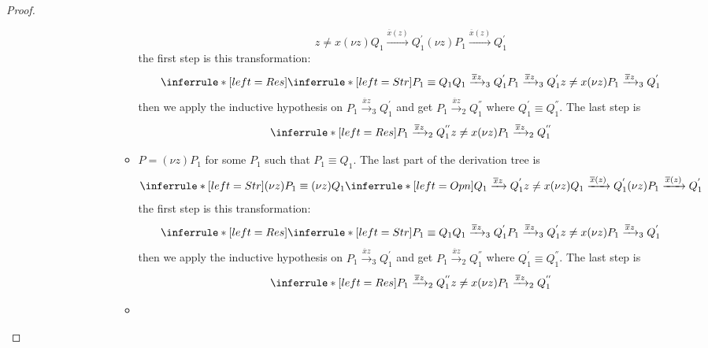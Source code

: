 \begin{theorem}
\begin{proof}
\begin{description}
\begin{description}
\begin{itemize}
\begin{description}
\begin{itemize}
\[{{				  z\neq x
			      }{
				(\nu z) Q_{1} \xrightarrow{\overline{x}(z)} Q_{1}^{'}
			      }
			  }{
			    (\nu z) P_{1} \xrightarrow{\overline{x}(z)} Q_{1}^{'}
			  }
			\]
			the first step is this transformation:
			\[
			  \inferrule* [left=Res]{
			      \inferrule* [left=Str]{
				  P_{1}\equiv Q_{1}
				\\
				  Q_{1}\xrightarrow{\overline{x}z}_{3}Q_{1}^{'}
			      }{
				P_{1}\xrightarrow{\overline{x}z}_{3}Q_{1}^{'}
			      }
			    \\
			      z\neq x
			  }{
			    (\nu z)P_{1}\xrightarrow{\overline{x}z}_{3}Q_{1}^{'}
			  }
			\]
			then we apply the inductive hypothesis on $P_{1}\xrightarrow{\overline{x}z}_{3}Q_{1}^{'}$ and get $P_{1}\xrightarrow{\overline{x}z}_{2}Q_{1}^{''}$ where $Q_{1}^{'}\equiv Q_{1}^{''}$. The last step is 
			\[
			  \inferrule* [left=Res]{
			      P_{1}\xrightarrow{\overline{x}z}_{2}Q_{1}^{''}
			    \\
			      z\neq x
			  }{
			    (\nu z)P_{1}\xrightarrow{\overline{x}z}_{2}Q_{1}^{''}
			  }
			\]
		      \item
			$P=(\nu z) P_{1}$ for some $P_{1}$ such that $P_{1}\equiv Q_{1}$. The last part of the derivation tree is 
			\[
			  \inferrule* [left=Str]{
			      (\nu z) P_{1}\equiv (\nu z) Q_{1}
			    \\
			      \inferrule* [left=Opn]{
				  Q_{1} \xrightarrow{\overline{x}z} Q_{1}^{'}
				\\
				  z\neq x
			      }{
				(\nu z) Q_{1} \xrightarrow{\overline{x}(z)} Q_{1}^{'}
			      }
			  }{
			    (\nu z) P_{1} \xrightarrow{\overline{x}(z)} Q_{1}^{'}
			  }
			\]
			the first step is this transformation:
			\[
			  \inferrule* [left=Res]{
			      \inferrule* [left=Str]{
				  P_{1}\equiv Q_{1}
				\\
				  Q_{1}\xrightarrow{\overline{x}z}_{3}Q_{1}^{'}
			      }{
				P_{1}\xrightarrow{\overline{x}z}_{3}Q_{1}^{'}
			      }
			    \\
			      z\neq x
			  }{
			    (\nu z)P_{1}\xrightarrow{\overline{x}z}_{3}Q_{1}^{'}
			  }
			\]
			then we apply the inductive hypothesis on $P_{1}\xrightarrow{\overline{x}z}_{3}Q_{1}^{'}$ and get $P_{1}\xrightarrow{\overline{x}z}_{2}Q_{1}^{''}$ where $Q_{1}^{'}\equiv Q_{1}^{''}$. The last step is 
			\[
			  \inferrule* [left=Res]{
			      P_{1}\xrightarrow{\overline{x}z}_{2}Q_{1}^{''}
			    \\
			      z\neq x
			  }{
			    (\nu z)P_{1}\xrightarrow{\overline{x}z}_{2}Q_{1}^{''}
			  }
			\]
		      \item

\end{itemize}
\end{description}
\end{itemize}
\end{description}
\end{description}
\end{proof}
\end{theorem}
